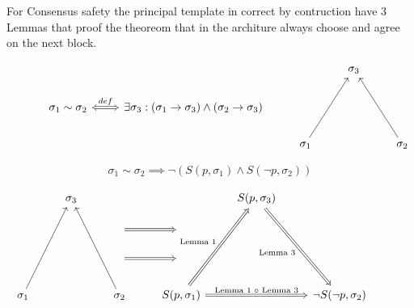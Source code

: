 \documentclass{article}
\begin{document}
For Consensus safety the principal template in correct by contruction have 3 Lemmas that proof the theoreom that in the architure always choose and agree on the next block.
\begin{defn}

\begin{equation*}
\begin{tikzcd}
{}
  &
{}  
  &
{}  
  &
{}
  &
\sigma_3
  &
{}
  \\
{}
  &
\sigma_1 \sim \sigma_2
  \arrow[r,Leftrightarrow, "def"]
  &
\exists \sigma_3:(\sigma_1 \to \sigma_3) \land (\sigma_2 \to \sigma_3)
  &
{}  
  &
{}
  &
{}
  \\
{}  
  &
{}  
  &
{}
  &
\sigma_1
  \arrow[uur,""]
  &
{}
  &
\sigma_2
  \arrow[uul,""]
\end{tikzcd}
\end{equation*}
\end{defn}

\begin{thm}
\begin{description}
$$
\sigma_1 \sim \sigma_2 \implies \neg(S(p,\sigma_1) \land S(\neg{p},\sigma_2))
$$
\end{description}
\end{thm}
\begin{equation*}
\begin{tikzcd}
{}
  &
\sigma_3
  &
{}
  &
{}
  &
S(p,\sigma_3)
  &
{}
  &
{}
  \\ 
{}
  &
{}
  &
{}
  \arrow[r,Rightarrow,""]
  &
{}
  &
{}
  &
{}
  &
{}
  \\
{}
  &
{}
  &
{}
  \arrow[r,Rightarrow,""]
  &
{}
  &
{}
  &
{}
  &
{}
  \\
\sigma_1
  \arrow[uuur,""]
  &
{}
  &
\sigma_2
  \arrow[uuul,""]
{}
  &
S(p,\sigma_1)
  \arrow[uuur,Rightarrow,"\text{Lemma 1}"]
  \arrow[rr,Rightarrow,"\text{Lemma 1 $\circ$ Lemma 3}"]
  &
{}
  &
\neg{S(\neg{p},\sigma_2)}
  \arrow[uuul,Leftarrow,"\text{Lemma 3}"] 
\end{tikzcd}
\end{equation*}
\end{document}
